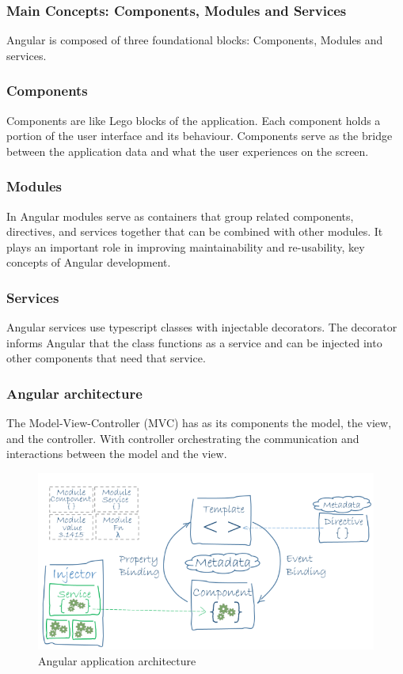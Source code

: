 \subsubsection{Main Concepts: Components, Modules and Services}
Angular is composed of three foundational blocks: Components, Modules and services.

\subsubsection{Components} Components are like Lego blocks of the application. Each component holds a portion of the user interface and its behaviour. Components serve as the bridge between the application data and what the user experiences on the screen.\cite{angular-components}

\subsubsection{Modules} In Angular modules serve as containers that group related components, directives, and services together that can be combined with other modules. It plays an important role in improving maintainability and re-usability, key concepts of Angular development.\cite{angular-modules}

\subsubsection{Services} Angular services use typescript classes with injectable decorators. The decorator informs Angular that the class functions as a service
and can be injected into other components that need that service.\cite{angular-services}
\subsubsection{Angular architecture} 
The Model-View-Controller (MVC) has as its components the model, the view, and the controller. With controller orchestrating the communication and
interactions between the model and the view.

\begin{figure}[ht]
    \centering
    \includegraphics[width=0.85\linewidth]{images/angular-arch.png}
    \caption{Angular application architecture}
    \label{fig:angular-arch}
\end{figure}

